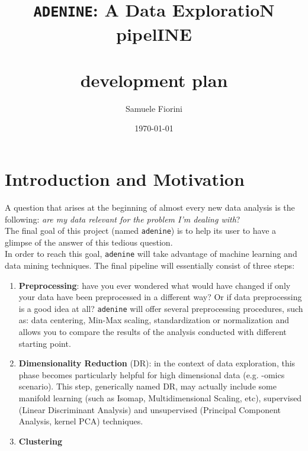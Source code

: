 \documentclass[paper=a4, fontsize=10pt]{scrartcl} %
\title{	
\normalfont \normalsize
\huge{\tt ADENINE}: A Data ExploratioN pipelINE \\
\horrule{2pt} \\[0.5cm] %
development plan \\ %
}
\author{Samuele Fiorini} %
\date{\normalsize\today} %
\numberwithin{equation}{section} %
\numberwithin{figure}{section} %
\numberwithin{table}{section} %
\newcommand{\adenine}{{\tt adenine}\xspace}
\begin{document}
\maketitle %


\section{Introduction and Motivation}

A question that arises at the beginning of almost every new data analysis is
the following:  {\sl are my data relevant for the problem I'm dealing with}? \\

The final goal of this project (named \adenine) is to help its user to have a glimpse of the answer of
this tedious question. \\

In order to reach this goal, \adenine will take advantage of machine learning and
data mining techniques. The final pipeline will essentially consist of three steps:

\begin{enumerate}
	
  	\item {\bf Preprocessing}: have you ever wondered what would have 
	changed if only  your data have been preprocessed in a different way? Or if
	data preprocessing is a good idea   at all? \adenine will offer several
	preprocessing procedures, such as: data centering, Min-Max scaling,
	standardization or normalization and allows you to compare the results of the
	analysis conducted with different starting point.
	
  	\item {\bf Dimensionality Reduction} (DR): in the context of data
	exploration, this  phase becomes particularly helpful for high dimensional data (e.g.
	-omics scenario).   This step, generically named DR, may actually include some
	manifold learning   (such as Isomap, Multidimensional Scaling, etc), supervised
	(Linear   Discriminant Analysis) and unsupervised (Principal Component Analysis, 
	kernel PCA)  techniques.

	\item {\bf Clustering}

\end{enumerate}
\end{document}
